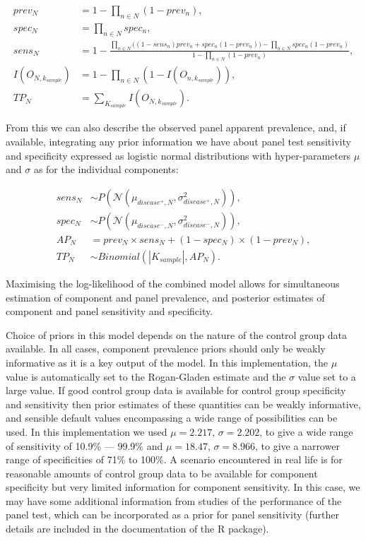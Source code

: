\documentclass[a4paper, 12pt, twoside]{article}
\begin{document}
\begin{equation*}
\begin{aligned}
prev_N &= 1-\prod_{n \in N}(1-prev_n), \\
spec_N &= \prod_{n \in N}{spec_n}, \\
sens_N &= 1-\frac{
  \prod_{n \in N}{\bigg((1-sens_n) prev_n + spec_n  (1-prev_n) \bigg) } - \prod_{n \in N}{spec_n (1-prev_n)}
}{
  1 - \prod_{n \in N}{ (1-prev_n)} %
}, \\
I(O_{N,k_{sample}}) &= 1-\prod_{n \in N}{(1-I(O_{n,k_{sample}}))}, \\
TP_N &= \sum_{K_{sample}}{I(O_{N,k_{sample}})}.
\end{aligned}
\end{equation*}

From this we can also describe the observed panel apparent prevalence, and, if available, integrating any prior information we have about panel test sensitivity and specificity expressed as logistic normal distributions with hyper-parameters \(\mu\) and \(\sigma\) as for the individual components:

\begin{equation*}
\begin{aligned}
sens_N &\sim P(\mathcal{N}(\mu_{disease^+,N}, \sigma_{disease^+,N}^2)), \\
spec_N &\sim P(\mathcal{N}(\mu_{disease^-,N}, \sigma_{disease^-,N}^2)), \\
AP_N &= prev_N \times sens_N + (1-spec_N) \times (1-prev_N), \\
TP_N &\sim Binomial(|K_{sample}|, AP_N).
\end{aligned}
\end{equation*}

Maximising the log-likelihood of the combined model allows for simultaneous estimation of component and panel prevalence, and posterior estimates of component and panel sensitivity and specificity.

Choice of priors in this model depends on the nature of the control group data available. In all cases, component prevalence priors should only be weakly informative as it is a key output of the model. In this implementation, the \(\mu\) value is automatically set to the Rogan-Gladen estimate and the \(\sigma\) value set to a large value. If good control group data is available for control group specificity and sensitivity then prior estimates of these quantities can be weakly informative, and sensible default values encompassing a wide range of possibilities can be used. In this implementation we used \(\mu=2.217\), \(\sigma=2.202\), to give a wide range of sensitivity of 10.9\% — 99.9\% and \(\mu=18.47\), \(\sigma=8.966\), to give a narrower range of specificities of 71\% to 100\%. A scenario encountered in real life is for reasonable amounts of control group data to be available for component specificity but very limited information for component sensitivity. In this case, we may have some additional information from studies of the performance of the panel test, which can be incorporated as a prior for panel sensitivity (further details are included in the documentation of the R package\cite{challen2023}).
\end{document}
